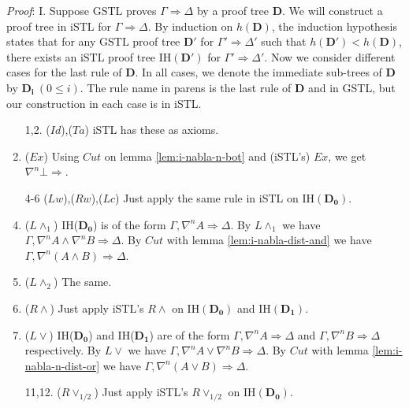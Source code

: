 \textit{Proof}: I. Suppose $\text{GSTL}$ proves $\Gamma \Rightarrow \Delta$ by a proof tree $\mathbf{D}$. We will construct a proof tree in $\text{iSTL}$ for $\Gamma \Rightarrow \Delta$. By induction on $h(\mathbf{D})$, the induction hypothesis states that for any $\text{GSTL}$ proof tree $\mathbf{D}'$ for $\Gamma' \Rightarrow \Delta'$ such that $h(\mathbf{D}') < h(\mathbf{D})$, there exists an $\text{iSTL}$ proof tree IH$(\mathbf{D'})$ for $\Gamma' \Rightarrow \Delta'$. Now we consider different cases for the last rule of $\mathbf{D}$. In all cases, we denote the immediate sub-trees of $\mathbf{D}$ by $\mathbf{D_i} ~(0 \leq i)$. The rule name in parens is the last rule of $\mathbf{D}$ and in GSTL, but our construction in each case is in iSTL.
\begin{enumerate}
	\item[1,2.] ($Id$),($Ta$) iSTL has these as axioms.
	\setcounter{enumi}{2}

	\item ($Ex$) Using $Cut$ on lemma \ref{lem:i-nabla-n-bot} and (iSTL's) $Ex$, we get $\nabla^n \bot \Rightarrow$.

	\item[4-6] ($Lw$),($Rw$),($Lc$) Just apply the same rule in iSTL on IH$(\mathbf{D_0})$.
	\setcounter{enumi}{6}

	\item ($L\land_1$) IH($\mathbf{D_0}$) is of the form $\Gamma , \nabla^n A \Rightarrow \Delta$. By $L\land_1$ we have $\Gamma , \nabla^n A \land \nabla^n B \Rightarrow \Delta$. By $Cut$ with lemma \ref{lem:i-nabla-dist-and} we have $\Gamma , \nabla^n (A \land B) \Rightarrow \Delta$.
	
	\item ($L\land_2$) The same.
	
	\item ($R\land$) Just apply iSTL's $R\land$ on IH$(\mathbf{D_0})$ and IH$(\mathbf{D_1})$.
	
	\item ($L\lor$) IH($\mathbf{D_0}$) and IH($\mathbf{D_1}$) are of the form $\Gamma , \nabla^n A \Rightarrow \Delta$ and $\Gamma , \nabla^n B \Rightarrow \Delta$ respectively. By $L\lor$ we have $\Gamma , \nabla^n A \lor \nabla^n B \Rightarrow \Delta$. By $Cut$ with lemma \ref{lem:i-nabla-n-dist-or} we have $\Gamma , \nabla^n (A \lor B) \Rightarrow \Delta$.
	
	\item[11,12.] ($R\lor_{1/2}$) Just apply iSTL's $R\lor_{1/2}$ on IH$(\mathbf{D_0})$.
	\setcounter{enumi}{12}
	

\end{enumerate}
